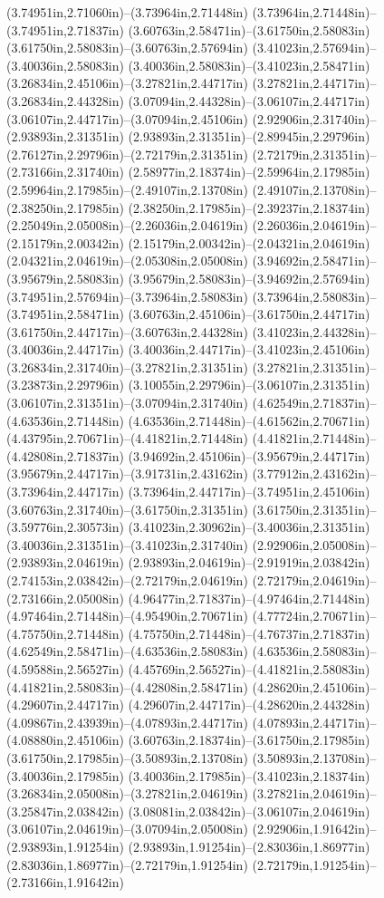(3.74951in,2.71060in)--(3.73964in,2.71448in) (3.73964in,2.71448in)--(3.74951in,2.71837in) (3.60763in,2.58471in)--(3.61750in,2.58083in) (3.61750in,2.58083in)--(3.60763in,2.57694in) (3.41023in,2.57694in)--(3.40036in,2.58083in) (3.40036in,2.58083in)--(3.41023in,2.58471in) (3.26834in,2.45106in)--(3.27821in,2.44717in) (3.27821in,2.44717in)--(3.26834in,2.44328in) (3.07094in,2.44328in)--(3.06107in,2.44717in) (3.06107in,2.44717in)--(3.07094in,2.45106in) (2.92906in,2.31740in)--(2.93893in,2.31351in) (2.93893in,2.31351in)--(2.89945in,2.29796in) (2.76127in,2.29796in)--(2.72179in,2.31351in) (2.72179in,2.31351in)--(2.73166in,2.31740in) (2.58977in,2.18374in)--(2.59964in,2.17985in) (2.59964in,2.17985in)--(2.49107in,2.13708in) (2.49107in,2.13708in)--(2.38250in,2.17985in) (2.38250in,2.17985in)--(2.39237in,2.18374in) (2.25049in,2.05008in)--(2.26036in,2.04619in) (2.26036in,2.04619in)--(2.15179in,2.00342in) (2.15179in,2.00342in)--(2.04321in,2.04619in) (2.04321in,2.04619in)--(2.05308in,2.05008in) (3.94692in,2.58471in)--(3.95679in,2.58083in) (3.95679in,2.58083in)--(3.94692in,2.57694in) (3.74951in,2.57694in)--(3.73964in,2.58083in) (3.73964in,2.58083in)--(3.74951in,2.58471in) (3.60763in,2.45106in)--(3.61750in,2.44717in) (3.61750in,2.44717in)--(3.60763in,2.44328in) (3.41023in,2.44328in)--(3.40036in,2.44717in) (3.40036in,2.44717in)--(3.41023in,2.45106in) (3.26834in,2.31740in)--(3.27821in,2.31351in) (3.27821in,2.31351in)--(3.23873in,2.29796in) (3.10055in,2.29796in)--(3.06107in,2.31351in) (3.06107in,2.31351in)--(3.07094in,2.31740in) (4.62549in,2.71837in)--(4.63536in,2.71448in) (4.63536in,2.71448in)--(4.61562in,2.70671in) (4.43795in,2.70671in)--(4.41821in,2.71448in) (4.41821in,2.71448in)--(4.42808in,2.71837in) (3.94692in,2.45106in)--(3.95679in,2.44717in) (3.95679in,2.44717in)--(3.91731in,2.43162in) (3.77912in,2.43162in)--(3.73964in,2.44717in) (3.73964in,2.44717in)--(3.74951in,2.45106in) (3.60763in,2.31740in)--(3.61750in,2.31351in) (3.61750in,2.31351in)--(3.59776in,2.30573in) (3.41023in,2.30962in)--(3.40036in,2.31351in) (3.40036in,2.31351in)--(3.41023in,2.31740in) (2.92906in,2.05008in)--(2.93893in,2.04619in) (2.93893in,2.04619in)--(2.91919in,2.03842in) (2.74153in,2.03842in)--(2.72179in,2.04619in) (2.72179in,2.04619in)--(2.73166in,2.05008in) (4.96477in,2.71837in)--(4.97464in,2.71448in) (4.97464in,2.71448in)--(4.95490in,2.70671in) (4.77724in,2.70671in)--(4.75750in,2.71448in) (4.75750in,2.71448in)--(4.76737in,2.71837in) (4.62549in,2.58471in)--(4.63536in,2.58083in) (4.63536in,2.58083in)--(4.59588in,2.56527in) (4.45769in,2.56527in)--(4.41821in,2.58083in) (4.41821in,2.58083in)--(4.42808in,2.58471in) (4.28620in,2.45106in)--(4.29607in,2.44717in) (4.29607in,2.44717in)--(4.28620in,2.44328in) (4.09867in,2.43939in)--(4.07893in,2.44717in) (4.07893in,2.44717in)--(4.08880in,2.45106in) (3.60763in,2.18374in)--(3.61750in,2.17985in) (3.61750in,2.17985in)--(3.50893in,2.13708in) (3.50893in,2.13708in)--(3.40036in,2.17985in) (3.40036in,2.17985in)--(3.41023in,2.18374in) (3.26834in,2.05008in)--(3.27821in,2.04619in) (3.27821in,2.04619in)--(3.25847in,2.03842in) (3.08081in,2.03842in)--(3.06107in,2.04619in) (3.06107in,2.04619in)--(3.07094in,2.05008in) (2.92906in,1.91642in)--(2.93893in,1.91254in) (2.93893in,1.91254in)--(2.83036in,1.86977in) (2.83036in,1.86977in)--(2.72179in,1.91254in) (2.72179in,1.91254in)--(2.73166in,1.91642in) 